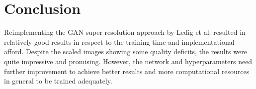 \documentclass[11pt,twocolumn,twoside,paper=a4]{IEEEtran}
\begin{document}
\section*{Conclusion}
Reimplementing the GAN super resolution approach by Ledig et al. resulted in relatively good results in respect to the training time and implementational afford.
Despite the scaled images showing some quality deficits, the results were quite impressive and promising. 
However, the network and hyperparameters need further improvement to achieve better results and more computational resources in general to be trained adequately.




\end{document}
